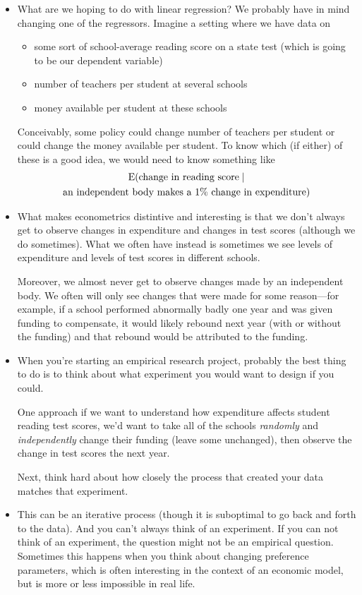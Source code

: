 \begin{itemize}

\item What are we hoping to do with linear regression?  We probably
  have in mind changing one of the regressors.  Imagine a setting
  where we have data on
  \begin{itemize}
  \item some sort of school-average reading score on a state test
    (which is going to be our dependent variable)
  \item number of teachers per student at several schools
  \item money available per student at these schools
  \end{itemize}
  Conceivably, some policy could change number of teachers per student
  or could change the money available per student.  To know which (if
  either) of these is a good idea, we would need to know something like
  \begin{multline*}
    \operatorname{E}(\text{change in reading score} \mid \\
       \text{an independent body makes a 1\% change in expenditure})
  \end{multline*}

\item What makes econometrics distintive and interesting is that we
  don't always get to observe changes in expenditure and changes in
  test scores (although we do sometimes).  What we often have instead
  is sometimes we see levels of expenditure and levels of test scores
  in different schools.

  Moreover, we almost never get to observe changes made by an
  independent body.  We often will only see changes that were made for
  some reason---for example, if a school performed abnormally badly one
  year and was given funding to compensate, it would likely rebound
  next year (with or without the funding) and that rebound would be
  attributed to the funding.

\item When you're starting an empirical research project, probably the
  best thing to do is to think about what experiment you would want to
  design if you could.

  One approach if we want to understand how expenditure affects
  student reading test scores, we'd want to take all of the schools
  \emph{randomly} and \emph{independently} change their funding (leave
  some unchanged), then observe the change in test scores the next
  year.

  Next, think hard about how closely the process that created your
  data matches that experiment.

\item This can be an iterative process (though it is suboptimal to go
  back and forth to the data).  And you can't always think of an
  experiment.  If you can not think of an experiment, the question
  might not be an empirical question.  Sometimes this happens when you
  think about changing preference parameters, which is often
  interesting in the context of an economic model, but is more or less
  impossible in real life.

\end{itemize}

